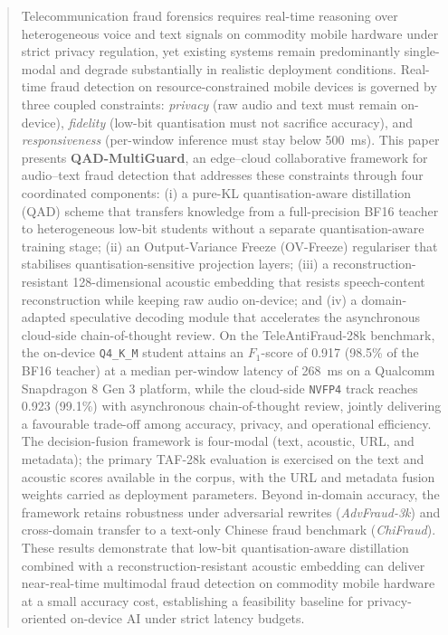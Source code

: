 \documentclass[a4paper,fleqn]{cas-sc}
\begin{document}
\begin{abstract}
Telecommunication fraud forensics requires real-time reasoning over heterogeneous voice and text signals on commodity mobile hardware under strict privacy regulation, yet existing systems remain predominantly single-modal and degrade substantially in realistic deployment conditions. Real-time fraud detection on resource-constrained mobile devices is governed by three coupled constraints: \textit{privacy} (raw audio and text must remain on-device), \textit{fidelity} (low-bit quantisation must not sacrifice accuracy), and \textit{responsiveness} (per-window inference must stay below 500~ms). This paper presents \textbf{QAD-MultiGuard}, an edge--cloud collaborative framework for audio--text fraud detection that addresses these constraints through four coordinated components: (i) a pure-KL quantisation-aware distillation (QAD) scheme that transfers knowledge from a full-precision BF16 teacher to heterogeneous low-bit students without a separate quantisation-aware training stage; (ii) an Output-Variance Freeze (OV-Freeze) regulariser that stabilises quantisation-sensitive projection layers; (iii) a reconstruction-resistant 128-dimensional acoustic embedding that resists speech-content reconstruction while keeping raw audio on-device; and (iv) a domain-adapted speculative decoding module that accelerates the asynchronous cloud-side chain-of-thought review. On the TeleAntiFraud-28k benchmark, the on-device \texttt{Q4\_K\_M} student attains an $F_1$-score of 0.917 (98.5\% of the BF16 teacher) at a median per-window latency of 268~ms on a Qualcomm Snapdragon 8 Gen 3 platform, while the cloud-side \texttt{NVFP4} track reaches 0.923 (99.1\%) with asynchronous chain-of-thought review, jointly delivering a favourable trade-off among accuracy, privacy, and operational efficiency. The decision-fusion framework is four-modal (text, acoustic, URL, and metadata); the primary TAF-28k evaluation is exercised on the text and acoustic scores available in the corpus, with the URL and metadata fusion weights carried as deployment parameters. Beyond in-domain accuracy, the framework retains robustness under adversarial rewrites (\textit{AdvFraud-3k}) and cross-domain transfer to a text-only Chinese fraud benchmark (\textit{ChiFraud}). These results demonstrate that low-bit quantisation-aware distillation combined with a reconstruction-resistant acoustic embedding can deliver near-real-time multimodal fraud detection on commodity mobile hardware at a small accuracy cost, establishing a feasibility baseline for privacy-oriented on-device AI under strict latency budgets.
\end{abstract}
\end{document}
